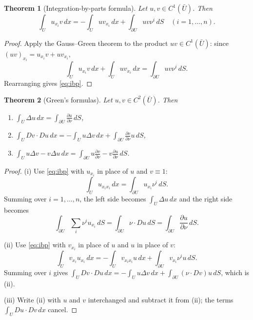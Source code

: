 \documentclass[11pt]{article}
\theoremstyle{plain}
\newtheorem{theorem}{Theorem}[section]
\theoremstyle{definition}
\theoremstyle{remark}
\begin{document}
\begin{theorem}[Integration-by-parts formula]\label{thm:ibp}
Let $u, v \in C^1(\bar U)$. Then
\begin{equation}\label{eq:ibp}
\int_U u_{x_i} v\, dx = -\int_U u v_{x_i}\, dx + \int_{\partial U} u v \nu^i\, dS \quad (i = 1, \dots, n).
\end{equation}
\end{theorem}
\begin{proof}
Apply the Gauss--Green theorem to the product $uv \in C^1(\bar U)$: since $(uv)_{x_i} = u_{x_i} v + u v_{x_i}$,
$$ \int_U u_{x_i} v\, dx + \int_U u v_{x_i}\, dx = \int_{\partial U} uv \nu^i\, dS. $$
Rearranging gives \eqref{eq:ibp}.
\end{proof}

\begin{theorem}[Green's formulas]\label{thm:green}
Let $u, v \in C^2(\bar U)$. Then
\begin{enumerate}
    \item[(i)] $\displaystyle\int_U \Delta u\, dx = \int_{\partial U} \frac{\partial u}{\partial \nu}\, dS$,
    \item[(ii)] $\displaystyle\int_U Dv \cdot Du\, dx = -\int_U u \Delta v\, dx + \int_{\partial U} \frac{\partial v}{\partial \nu} u\, dS$,
    \item[(iii)] $\displaystyle\int_U u \Delta v - v \Delta u\, dx = \int_{\partial U} u \frac{\partial v}{\partial \nu} - v \frac{\partial u}{\partial \nu}\, dS$.
\end{enumerate}
\end{theorem}
\begin{proof}
(i) Use \eqref{eq:ibp} with $u_{x_i}$ in place of $u$ and $v \equiv 1$:
$$ \int_U u_{x_i x_i}\, dx = \int_{\partial U} u_{x_i} \nu^i\, dS. $$
Summing over $i = 1, \dots, n$, the left side becomes $\int_U \Delta u\, dx$ and the right side becomes
$$ \int_{\partial U} \sum_i \nu^i u_{x_i}\, dS = \int_{\partial U} \nu \cdot Du\, dS = \int_{\partial U} \frac{\partial u}{\partial \nu}\, dS. $$

(ii) Use \eqref{eq:ibp} with $v_{x_i}$ in place of $u$ and $u$ in place of $v$:
$$ \int_U v_{x_i} u_{x_i}\, dx = -\int_U v_{x_i x_i} u\, dx + \int_{\partial U} v_{x_i} \nu^i u\, dS. $$
Summing over $i$ gives $\int_U Dv \cdot Du\, dx = -\int_U u\Delta v\, dx + \int_{\partial U} (\nu \cdot Dv) u\, dS$, which is (ii).

(iii) Write (ii) with $u$ and $v$ interchanged and subtract it from (ii); the terms $\int_U Du \cdot Dv\, dx$ cancel.
\end{proof}
\end{document}
